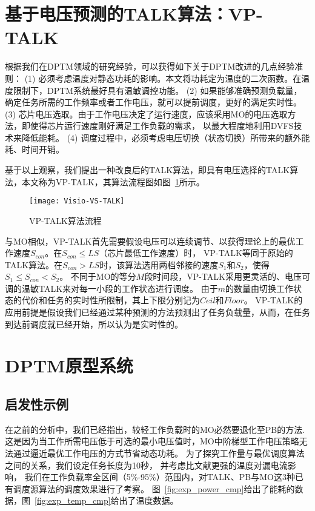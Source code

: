 \section{基于电压预测的TALK算法：VP-TALK}
\label{vp-talk}
根据我们在DPTM领域的研究经验，可以获得如下关于DPTM改进的几点经验准则：
(1)	必须考虑温度对静态功耗的影响。本文将功耗定为温度的二次函数。在温度限制下，DPTM系统最好具有温敏调控功能。
(2)	如果能够准确预测负载量，确定任务所需的工作频率或者工作电压，就可以提前调度，更好的满足实时性。
(3)	芯片电压选取。由于工作电压决定了运行速度，应该采用MO的电压选取方法，即使得芯片运行速度刚好满足工作负载的需求， 以最大程度地利用DVFS技术来降低能耗。
(4)	调度过程中，必须考虑电压切换（状态切换）所带来的额外能耗、时间开销。

基于以上观察，我们提出一种改良后的TALK算法，即具有电压选择的TALK算法，本文称为VP-TALK，其算法流程图如图~\ref{fig:vp-talk}所示。 

\begin{figure}[H] %
  \centering
  \texttt{[image: Visio-VS-TALK]}
  \caption{VP-TALK算法流程}
  \label{fig:vp-talk}
\end{figure}

与MO相似，VP-TALK首先需要假设电压可以连续调节、以获得理论上的最优工作速度$S_{con}$。在$S_{con}\leq LS$（芯片最低工作速度）时， VP-TALK等同于原始的TALK算法。在$S_{con}>{LS}$时，该算法选用两档邻接的速度$S_1$和$S_2$，使得$S_1\leq S_{con}<S_2$。 不同于MO的等分$M$段时间段，VP-TALK采用更灵活的、电压可调的温敏TALK来对每一小段的工作状态进行调度。 由于$m$的数量由切换工作状态的代价和任务的实时性所限制，其上下限分别记为$Ceil$和$Floor$。 VP-TALK的应用前提是假设我们已经通过某种预测的方法预测出了任务负载量，从而，在任务到达前调度就已经开始，所以认为是实时性的。


\section{DPTM原型系统}
\label{DPTM-system}


\subsection{启发性示例}

在之前的分析中，我们已经指出，较轻工作负载时的MO必然要退化至PB的方法. 这是因为当工作所需电压低于可选的最小电压值时，MO中阶梯型工作电压策略无法通过逼近最优工作电压的方式节省动态功耗。 为了探究工作量与最优调度算法之间的关系，我们设定任务长度为10秒， 并考虑比文献更强的温度对漏电流影响， 我们在工作负载率全区间（5\%-95\%）范围内，对TALK、PB与MO这3种已有调度源算法的调度效果进行了考察。 图~\ref{fig:exp_power_cmp}给出了能耗的数据，图~\ref{fig:exp_temp_cmp}给出了温度数据。


